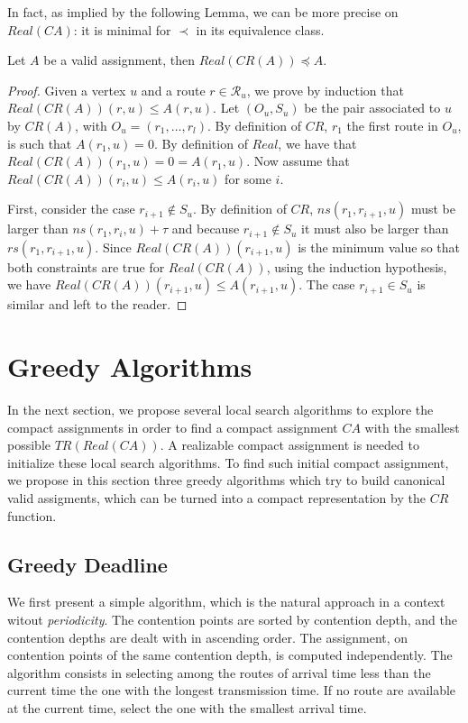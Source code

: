 In fact, as implied by the following Lemma, we can be more precise on $Real(CA)$: it is minimal for $\prec$ in its equivalence class.

\begin{lemma}\label{lemma:prec}
Let $A$ be a valid assignment, then $Real(CR(A)) \preceq A$.
\end{lemma}
\begin{proof}
Given a vertex $u$ and a route $r \in \mathcal{R}_u$, we prove by induction that $Real(CR(A))(r,u) \leq A(r,u)$.
Let $(O_u,S_u)$ be the pair associated to $u$ by $CR(A)$, with $O_u = (r_1,\dots,r_l)$. By definition of $CR$, $r_1$ the first route in $O_u$, is such that $A(r_1,u) = 0$. By definition of $Real$, we have that  $Real(CR(A))(r_1,u) = 0 = A(r_1,u)$.
Now assume that $Real(CR(A))(r_i,u) \leq A(r_i,u)$ for some $i$. 

First, consider the case $r_{i+1} \notin S_u$. By definition of $CR$, $ns(r_1,r_{i+1},u)$ must be larger than 
$ns(r_1,r_{i},u)+ \tau$ and because $r_{i+1} \notin S_u$ it must also be larger than $rs(r_1,r_{i+1},u)$. 
Since $Real(CR(A))(r_{i+1},u)$ is the minimum value so that both constraints are true for $Real(CR(A))$, using
the induction hypothesis, we have $Real(CR(A))(r_{i+1},u) \leq A(r_{i+1},u)$. The case $r_{i+1} \in S_u$ is similar and left to the reader.
\end{proof}


\section{Greedy Algorithms}
 
 In the next section, we propose several local search algorithms to explore the compact assignments in order to find a compact assignment $CA$ with the smallest possible $TR(Real(CA))$. A realizable compact assignment is needed to initialize these local search algorithms. To find such initial compact assignment, we propose in this section three greedy algorithms which try to build canonical valid assigments, which can be turned into a compact representation by the $CR$ function.

\subsection{Greedy Deadline}

We first present a simple algorithm, which is the natural approach in a context witout \emph{periodicity}.
The contention points are sorted by contention depth, and the contention depths are dealt with in ascending order. The assignment, on contention points of the same contention depth, is computed independently. The \greedydeadline algorithm consists in selecting among the routes of arrival time less than the current time the one with the longest transmission time. If no route are available at the current time, select the one with the smallest arrival time.

